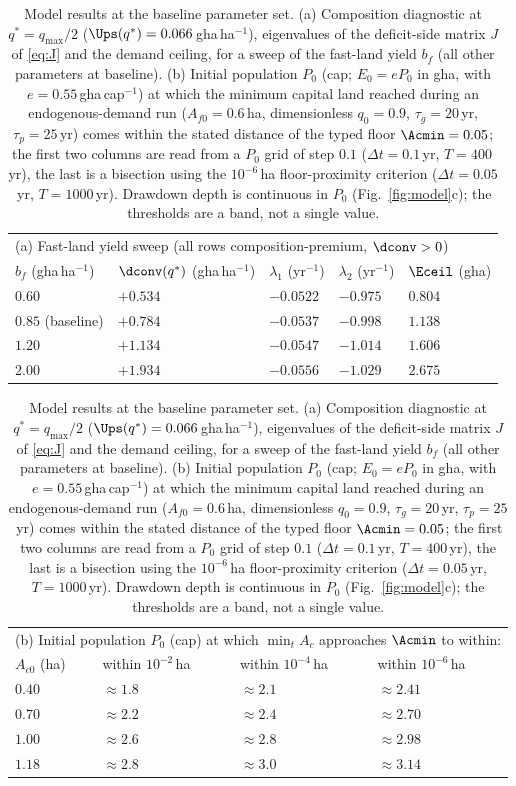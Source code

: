 \begin{table}[!htbp]
\centering\small
\caption{Model results at the baseline parameter set. (a) Composition diagnostic at $q^*=q_{\max}/2$ ($\Ups(q^*)=0.066$\,gha\,ha$^{-1}$), eigenvalues of the deficit-side matrix $J$ of \eqref{eq:J} and the demand ceiling, for a sweep of the fast-land yield $b_f$ (all other parameters at baseline). (b) Initial population $P_0$ (cap; $E_0=eP_0$ in gha, with $e=0.55$\,gha\,cap$^{-1}$) at which the minimum capital land reached during an endogenous-demand run ($A_{f0}=0.6$\,ha, dimensionless $q_0=0.9$, $\tau_g=20$\,yr, $\tau_p=25$\,yr) comes within the stated distance of the typed floor $\Acmin=0.05$; the first two columns are read from a $P_0$ grid of step $0.1$ ($\Delta t=0.1$\,yr, $T=400$\,yr), the last is a bisection using the $10^{-6}$\,ha floor-proximity criterion ($\Delta t=0.05$\,yr, $T=1000$\,yr). Drawdown depth is continuous in $P_0$ (Fig.~\ref{fig:model}c); the thresholds are a band, not a single value.}
\label{tab:model}
\begin{tabular}{l l l l l}
\toprule
\multicolumn{5}{l}{(a) Fast-land yield sweep (all rows composition-premium, $\dconv>0$)}\\
$b_f$ (gha\,ha$^{-1}$) & $\dconv(q^*)$ (gha\,ha$^{-1}$) & $\lambda_1$ (yr$^{-1}$) & $\lambda_2$ (yr$^{-1}$) & $\Eceil$ (gha) \\
\midrule
$0.60$ & $+0.534$ & $-0.0522$ & $-0.975$ & $0.804$ \\
$0.85$ (baseline) & $+0.784$ & $-0.0537$ & $-0.998$ & $1.138$ \\
$1.20$ & $+1.134$ & $-0.0547$ & $-1.014$ & $1.606$ \\
$2.00$ & $+1.934$ & $-0.0556$ & $-1.029$ & $2.675$ \\
\bottomrule
\end{tabular}

\medskip
\begin{tabular}{l l l l}
\toprule
\multicolumn{4}{l}{(b) Initial population $P_0$ (cap) at which $\min_tA_c$ approaches $\Acmin$ to within:}\\ 
$A_{c0}$ (ha) & within $10^{-2}$\,ha & within $10^{-4}$\,ha & within $10^{-6}$\,ha \\
\midrule
$0.40$ & $\approx1.8$ & $\approx2.1$ & $\approx2.41$ \\
$0.70$ & $\approx2.2$ & $\approx2.4$ & $\approx2.70$ \\
$1.00$ & $\approx2.6$ & $\approx2.8$ & $\approx2.98$ \\
$1.18$ & $\approx2.8$ & $\approx3.0$ & $\approx3.14$ \\
\bottomrule
\end{tabular}
\end{table}

